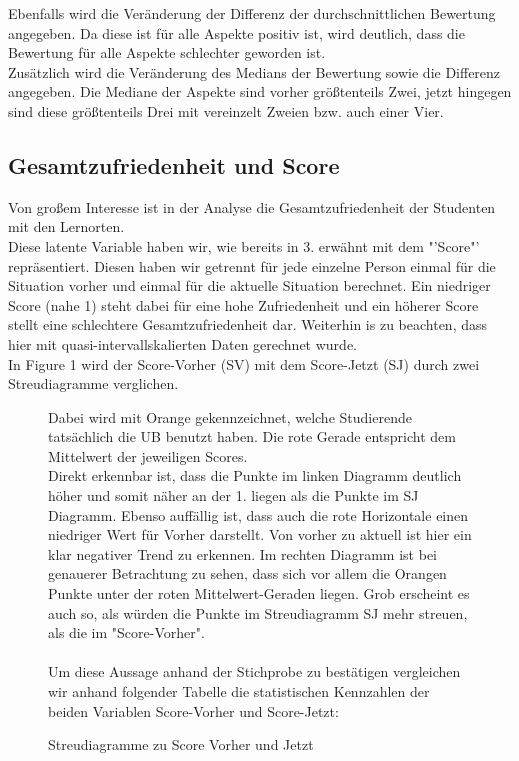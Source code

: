 \documentclass[11pt, a4paper]{article}
\begin{document}
Ebenfalls wird die Veränderung der Differenz der durchschnittlichen Bewertung angegeben. Da diese ist für alle Aspekte positiv ist, wird deutlich, dass die Bewertung für alle Aspekte schlechter geworden ist.\\
Zusätzlich wird die Veränderung des Medians der Bewertung sowie die Differenz angegeben.
Die Mediane der Aspekte sind vorher größtenteils Zwei, jetzt hingegen sind diese größtenteils Drei mit vereinzelt Zweien bzw. auch einer Vier. %



\subsection{Gesamtzufriedenheit und Score}



Von großem Interesse ist in der Analyse die Gesamtzufriedenheit der Studenten mit den Lernorten.\\ Diese latente Variable haben wir, wie bereits in 3. erwähnt mit dem "'Score"' repräsentiert.
Diesen haben wir getrennt für jede einzelne Person einmal für die Situation vorher und einmal für die aktuelle Situation berechnet.
Ein niedriger Score (nahe 1) steht dabei für eine hohe Zufriedenheit und ein höherer Score stellt eine schlechtere Gesamtzufriedenheit dar.
Weiterhin is zu beachten, dass hier mit quasi-intervallskalierten Daten gerechnet wurde. \\
In Figure 1 wird der Score-Vorher (SV) mit dem Score-Jetzt (SJ) durch zwei Streudiagramme verglichen.
\vspace{-0.5cm}
\begin{figure}[h]
{\centering 
\vspace{-2.9cm}
\caption{Streudiagramme zu Score Vorher und Jetzt}}
\vspace{0.3cm}
Dabei wird mit Orange gekennzeichnet, welche Studierende tatsächlich die UB benutzt haben. Die rote Gerade entspricht dem Mittelwert der jeweiligen Scores. \\
Direkt erkennbar ist, dass die Punkte im linken Diagramm deutlich höher und somit näher an der 1. liegen als die Punkte im SJ Diagramm.
Ebenso auffällig ist, dass auch die rote Horizontale einen niedriger Wert für Vorher darstellt. 
Von vorher zu aktuell ist hier ein klar negativer Trend zu erkennen.
Im rechten Diagramm ist bei genauerer Betrachtung zu sehen, dass sich vor allem die Orangen Punkte unter der roten Mittelwert-Geraden liegen.
Grob erscheint es auch so, als würden die Punkte im Streudiagramm SJ mehr streuen, als die im "Score-Vorher".\\\\
Um diese Aussage anhand der Stichprobe zu bestätigen vergleichen wir anhand folgender Tabelle die statistischen Kennzahlen der beiden Variablen Score-Vorher und Score-Jetzt:\\
\end{figure}
\end{document}

